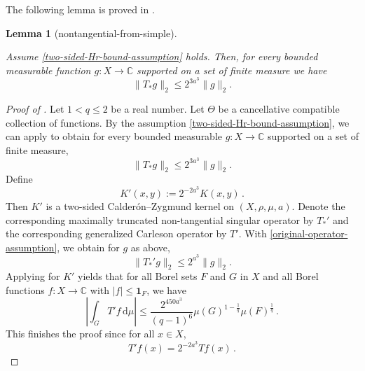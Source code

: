\documentclass[10pt,a4paper]{article}
\theoremstyle{plain}
\newtheorem{lemma}[theorem]{Lemma}
\theoremstyle{definition}
\numberwithin{equation}{subsection}
\newcommand{\lean}[1]{}
\newcommand{\proves}[1]{}
\newcommand{\uses}[1]{}
\newcommand{\leanok}{}
\def\C{\mathbb{C}}
\begin{document}
The following lemma is proved in .
\begin{lemma}[nontangential-from-simple]\label{nontangential-from-simple}
    \leanok
    \lean{nontangential_from_simple}
    \uses{simple-nontangential-operator, nontangential-operator-boundary}
    Assume \eqref{two-sided-Hr-bound-assumption} holds.
    Then, for every bounded measurable function $g : X \to \C$ supported on a set of finite measure we have
    \begin{equation}\label{concretetstarbound}
        \|T_*g\|_2\le 2^{3a^3}\|g\|_2.
    \end{equation}
\end{lemma}

\begin{proof}[Proof of ]
    \proves{two-sided-metric-space-Carleson}
    \leanok
    Let $1<q\le 2$ be a real number. Let $\Theta$ be a cancellative compatible collection of functions.
    By the assumption \eqref{two-sided-Hr-bound-assumption}, we can apply  to obtain for every bounded measurable $g:X\to\C$ supported on a set of finite measure,
    \begin{equation}\label{original-operator-assumption}
        \|T_*g\|_2\le 2^{3a^3}\|g\|_2.
    \end{equation}
    Define
    \begin{equation*}
        K'(x,y):= 2^{-2a^3} K(x,y) \,.
    \end{equation*}
    Then $K'$ is a two-sided Calder\'on--Zygmund kernel on $(X,\rho,\mu,a)$. Denote the corresponding maximally truncated non-tangential singular operator by $T_*'$ and the corresponding generalized Carleson operator by $T'$.
    With \eqref{original-operator-assumption}, we obtain for $g$ as above,
    \begin{equation}\label{modified-operator-assumption}
        \|T_*'g\|_2\le 2^{a^3}\|g\|_2.
    \end{equation}
    Applying  for $K'$ yields that for all Borel sets $F$ and $G$ in $X$ and
    all Borel functions $f:X\to \C$ with
    $|f|\le \mathbf{1}_F$, we have
    \begin{equation*}
        \left|\int_{G} T' f \, \mathrm{d}\mu\right| \leq \frac{2^{450a^3}}{(q-1)^6} \mu(G)^{1-\frac{1}{q}} \mu(F)^{\frac{1}{q}}\, .
    \end{equation*}
    This finishes the proof since for all $x\in X$,
    \begin{equation*}
        T'f(x) = 2^{-2a^3} Tf(x) \,.
    \end{equation*}
\end{proof}
\end{document}
